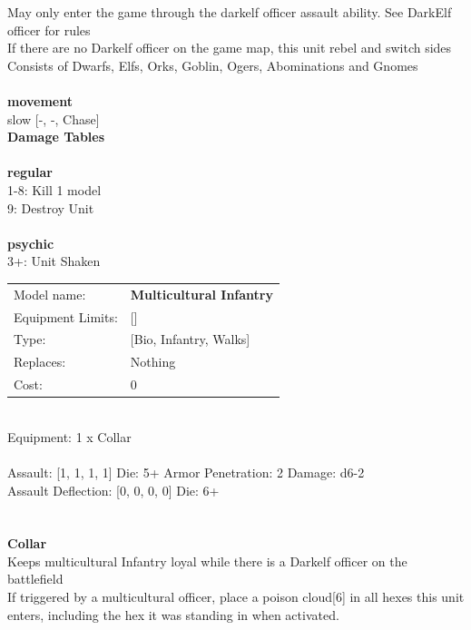 {\noindent May only enter the game through the darkelf officer assault ability. See DarkElf officer for rules\\ 
If there are no Darkelf officer on the game map, this unit rebel and switch sides\\ 
Consists of Dwarfs, Elfs, Orks, Goblin, Ogers, Abominations and Gnomes\\ 


\ \\ {\bf movement } \\
slow [-, -, Chase] \\


{\bf Damage Tables} \\
\ \\ {\bf regular } \\
1-8: Kill 1 model \\
9: Destroy Unit \\
\ \\ {\bf psychic } \\
3+: Unit Shaken \\


\noindent
\begin{tabular}{ll}
Model name: &{\bf Multicultural Infantry } \\
Equipment Limits: &[] \\
Type: &[Bio, Infantry, Walks] \\
Replaces: &Nothing \\
Cost: & 0\\
\end{tabular}
\ \\
Equipment: 1 x Collar \\
\ \\
Assault: [1, 1, 1, 1] Die: 5+ Armor Penetration: 2 Damage: d6-2 \\
Assault Deflection: [0, 0, 0, 0] Die: 6+\\
\indent  
\ \\

\ \\
{\bf Collar } \\

Keeps multicultural Infantry loyal while there is a Darkelf officer on the battlefield\\ 
If triggered by a multicultural officer, place a poison cloud[6] in all hexes this unit enters, including the hex it was standing in when activated.\\ 





}
